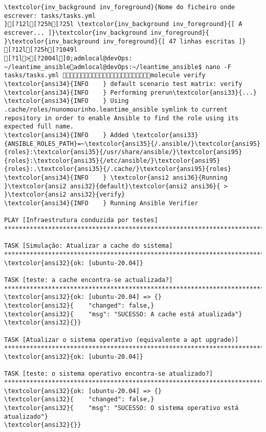 \documentclass{scrartcl}
\begin{document}
\begin{Verbatim}
\textcolor{inv_background inv_foreground}{Nome do ficheiro onde escrever: tasks/tasks.yml
}[?12l[?25h[?25l \textcolor{inv_background inv_foreground}{[ A escrever... ]}\textcolor{inv_background inv_foreground}{          }\textcolor{inv_background inv_foreground}{[ 47 linhas escritas ]}
[?12l[?25h[?1049l
[?1l>[?2004l]0;admlocal@devOps: ~/leantime_ansibleadmlocal@devOps:~/leantime_ansible$ nano -F tasks/tasks.yml molecule verify
\textcolor{ansi34}{INFO    } default scenario test matrix: verify
\textcolor{ansi34}{INFO    } Performing prerun\textcolor{ansi33}{...}
\textcolor{ansi34}{INFO    } Using .cache/roles/nunomourinho.leantime_ansible symlink to current repository in order to enable Ansible to find the role using its expected full name.
\textcolor{ansi34}{INFO    } Added \textcolor{ansi33}{ANSIBLE_ROLES_PATH}=~\textcolor{ansi35}{/.ansible/}\textcolor{ansi95}{roles}:\textcolor{ansi35}{/usr/share/ansible/}\textcolor{ansi95}{roles}:\textcolor{ansi35}{/etc/ansible/}\textcolor{ansi95}{roles}:.\textcolor{ansi35}{/.cache/}\textcolor{ansi95}{roles}
\textcolor{ansi34}{INFO    } \textcolor{ansi2 ansi36}{Running }\textcolor{ansi2 ansi32}{default}\textcolor{ansi2 ansi36}{ > }\textcolor{ansi2 ansi32}{verify}
\textcolor{ansi34}{INFO    } Running Ansible Verifier

PLAY [Infraestrutura conduzida por testes] **************************************************************************************************************************************************

TASK [Simulação: Atualizar a cache do sistema] **********************************************************************************************************************************************
\textcolor{ansi32}{ok: [ubuntu-20.04]}

TASK [teste: a cache encontra-se actualizada?] **********************************************************************************************************************************************
\textcolor{ansi32}{ok: [ubuntu-20.04] => {}
\textcolor{ansi32}{    "changed": false,}
\textcolor{ansi32}{    "msg": "SUCESSO: A cache está atualizada"}
\textcolor{ansi32}{}}

TASK [Atualizar o sistema operativo (equivalente a apt upgrade)] ****************************************************************************************************************************
\textcolor{ansi32}{ok: [ubuntu-20.04]}

TASK [teste: o sistema operativo encontra-se atualizado?] ***********************************************************************************************************************************
\textcolor{ansi32}{ok: [ubuntu-20.04] => {}
\textcolor{ansi32}{    "changed": false,}
\textcolor{ansi32}{    "msg": "SUCESSO: O sistema operativo está atualizado"}
\textcolor{ansi32}{}}


\end{Verbatim}
\end{document}
